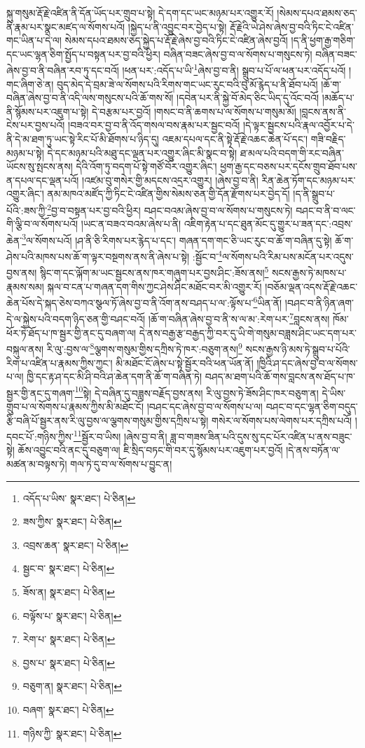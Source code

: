 སྐུ་གསུམ་རྡོ་རྗེ་འཛིན་ནི་དོན་ཡོད་པར་གྲུབ་པ་སྟེ། དེ་དག་དང་ཡང་མཉམ་པར་འགྱུར་རོ། །སེམས་དཔའ་ཐམས་ཅད་ནི་རྣམ་པར་སྣང་མཛད་ལ་སོགས་པའོ། །སྐྱེད་པ་ནི་འབྱུང་བར་བྱེད་པ་སྟེ། རྡོ་རྗེའི་ཡེ་ཤེས་ཞེས་བྱ་བའི་ཏིང་ངེ་འཛིན་གང་ཡིན་པ་དེ་ལ། སེམས་དཔའ་ཐམས་ཅད་སྐྱེད་པ་རྡོ་རྗེ་ཞེས་བྱ་བའི་ཏིང་ངེ་འཛིན་ཞེས་བྱའོ། །ད་ནི་ཕྱག་རྒྱ་གཅིག་དང་ཡང་ལྷན་ཅིག་སྤྱོད་པ་བསྟན་པར་བྱ་བའི་ཕྱིར། བཞིན་བཟང་ཞེས་བྱ་བ་ལ་སོགས་པ་གསུངས་ཏེ། བཞིན་བཟང་ཞེས་བྱ་བ་ནི་བཞིན་རབ་ཏུ་དང་བའོ། །ཕན་པར་:འདོད་པ་ཡི་\footnote{འདོད་པ་ཡིས་  སྣར་ཐང་།  པེ་ཅིན། }ཞེས་བྱ་བ་ནི། སྒྲུབ་པ་པོ་ལ་ཕན་པར་འདོད་པའོ། །གང་ཞིག་ཅེ་ན། བུད་མེད་དེ་བྲམ་ཟེ་ལ་སོགས་པའི་རིགས་གང་ཡང་རུང་བའི་བུ་མོ་རྙེད་པ་ནི་ཐོབ་པའོ། །ཆོ་ག་བཞིན་ཞེས་བྱ་བ་ནི་འདི་ལས་གསུངས་པའི་ཆོ་གས་སོ། །དབེན་པར་ནི་སྐྱེ་བོ་མེད་ཅིང་ཡིད་དུ་འོང་བའོ། །མཆོད་པ་ནི་སྙོམས་པར་འཇུག་པ་སྟེ། དེ་བརྩམ་པར་བྱའོ། །གསང་བ་ནི་ཆགས་པ་ལ་སོགས་པ་གསུམ་མོ། །བླངས་ནས་ནི་ངེས་པར་བྱས་པའོ། །བཟའ་བར་བྱ་བ་ནི་འོད་གསལ་བས་རྣམ་པར་སྦྱང་བའོ། །དེ་ལྟར་སྦྱངས་པའི་རྣལ་འབྱོར་པ་དེ་ནི་དེ་མ་ཐག་ཏུ་ཡང་སྟེ་རིང་པོ་མི་ཐོགས་པ་ཉིད་དུ། འཇམ་དཔལ་དང་ནི་སྟེ་རྡོ་རྗེ་འཆང་ཆེན་པོ་དང་། གཟི་བརྗིད་མཉམ་པ་སྟེ། དེ་དང་མཉམ་པའི་མཐུ་དང་ལྡན་པར་འགྱུར་ཞིང་མི་སྣང་བ་སྟེ། ཐ་མལ་པའི་བདག་གི་རང་བཞིན་ཡོངས་སུ་སྤངས་ནས། དེའི་འོག་ཏུ་བདག་པོ་སྟེ་གཙོ་བོར་འགྱུར་ཞིང་། ཕྱག་རྒྱ་དང་བཅས་པར་དངོས་གྲུབ་ཐོབ་པས་ན་དཔལ་དང་ལྡན་པའོ། །འཛམ་བུ་གསེར་གྱི་མདངས་འདྲར་འགྱུར། །ཞེས་བྱ་བ་ནི། རིན་ཆེན་ཏོག་དང་མཉམ་པར་འགྱུར་ཞིང་། ནམ་མཁའ་མཛོད་ཀྱི་ཏིང་ངེ་འཛིན་གྱིས་སེམས་ཅན་གྱི་དོན་རྫོགས་པར་བྱེད་དོ། །ད་ནི་སྒྲུབ་པ་པོའི་:ཟས་ཀྱི་\footnote{ཟས་ཀྱིས་  སྣར་ཐང་།  པེ་ཅིན། }བྱ་བ་བསྟན་པར་བྱ་བའི་ཕྱིར། བཤང་བའམ་ཞེས་བྱ་བ་ལ་སོགས་པ་གསུངས་ཏེ། བཤང་བ་ནི་བ་ལང་གི་ལྕི་བ་ལ་སོགས་པའོ། །ཡང་ན་བཟའ་བའམ་ཞེས་པ་ནི། འཇིག་རྟེན་པ་དང་ཐུན་མོང་དུ་གྱུར་པ་ཟན་དང་:འབྲས་ཆེན་\footnote{འབྲས་ཆན་  སྣར་ཐང་།  པེ་ཅིན། }ལ་སོགས་པའོ། །ཤ་ནི་ཅི་རིགས་པར་རྙེད་པ་དང་། གཞན་དག་གང་ཅི་ཡང་རུང་བ་ཆོ་ག་བཞིན་དུ་སྟེ། ཆོ་ག་ཤེས་པའི་མཁས་པས་ཆོ་ག་ལྟར་བསྔགས་ནས་ནི་ཞེས་པ་སྟེ། :སྦྱོང་བ་\footnote{སྦྱང་བ་  སྣར་ཐང་།  པེ་ཅིན། }ལ་སོགས་པའི་རིམ་པས་མངོན་པར་འདུས་བྱས་ནས། སྙིང་ག་དང་ལྐོག་མ་ཡང་སྦྱངས་ནས་ཁར་གཞུག་པར་བྱས་ཤིང་:ཟོས་ནས།\footnote{ཟོས་ན།  སྣར་ཐང་།  པེ་ཅིན། } སངས་རྒྱས་ཏེ་མཁས་པ་རྣམས་སམ། སྐལ་བ་ངན་པ་གཞན་དག་གིས་ཀྱང་ཤེས་ཤིང་མཐོང་བར་མི་འགྱུར་རོ། །བཅོམ་ལྡན་འདས་རྡོ་རྗེ་འཆང་ཆེན་པོས་དེ་སྐད་ཅེས་བཀའ་སྩལ་ཏོ་ཞེས་བྱ་བ་ནི་འོག་ནས་བཤད་པ་ལ་:ལྟོས་པ་\footnote{བལྟོས་པ་  སྣར་ཐང་།  པེ་ཅིན། }ཡིན་ནོ། །བཤང་བ་ནི་ཉིན་ཞག་དེ་ལ་སྐྱེས་པའི་བདག་ཉིད་ཅན་གྱི་བཤང་བའོ། །ཆོ་ག་བཞིན་ཞེས་བྱ་བ་ནི་ས་ལ་མ་:རེག་པར་\footnote{རེག་པ་  སྣར་ཐང་།  པེ་ཅིན། }བླངས་ནས། ཁོམ་ཕོར་ཏེ་ཐོད་པ་ཁ་སྦྱར་གྱི་ནང་དུ་བཞག་ལ། དེ་ནས་བརྒྱ་རྩ་བརྒྱད་ཀྱི་བར་དུ་ཡི་གེ་གསུམ་བཟླས་ཤིང་ཡང་དག་པར་བསྐུལ་ནས། རི་ལུ་:བྱས་ལ་\footnote{བྱས་པ་  སྣར་ཐང་།  པེ་ཅིན། }ལྕགས་གསུམ་གྱིས་དཀྲིས་ཏེ་ཁར་:བཅུག་ནས།\footnote{བཅུག་ན།  སྣར་ཐང་།  པེ་ཅིན། } སངས་རྒྱས་ཉི་མས་ཏེ་སྒྲུབ་པ་པོའི་རིག་པ་འཛིན་པ་རྣམས་ཀྱིས་ཀྱང་། མི་མཐོང་ངོ་ཞེས་པ་སྟེ་སྦྱོར་བའི་ཕན་ཡོན་ནོ། །ཁྱིའི་ཤ་དང་ཞེས་བྱ་བ་ལ་སོགས་པ་ལ། ཁྱི་དང་རྟ་ཤ་དང་མི་ཤི་བའི་ཤ་ཆེན་དག་ནི་ཆོ་ག་བཞིན་ཏེ། བཤད་མ་ཐག་པའི་ཆོ་གས་བླངས་ནས་ཐོད་པ་ཁ་སྦྱར་གྱི་ནང་དུ་གཞག་\footnote{བཞག་  སྣར་ཐང་།  པེ་ཅིན། }སྟེ། དེ་བཞིན་དུ་བཟླས་བརྗོད་བྱས་ནས། རི་ལུ་བྱས་ཏེ་ཟོས་ཤིང་ཁར་བཅུག་ན། དེ་ཡིས་གྲུབ་པ་ལ་སོགས་པ་རྣམས་ཀྱིས་མི་མཐོང་ངོ། །བཤང་དང་ཞེས་བྱ་བ་ལ་སོགས་པ་ལ། བཤང་བ་དང་ལྷན་ཅིག་བདུད་རྩི་བཞི་པོ་སྦྱར་ནས་རི་ལུ་བྱས་ལ་ལྕགས་གསུམ་གྱིས་དཀྲིས་པ་སྟེ། གསེར་ལ་སོགས་པས་ལེགས་པར་དཀྲིས་པའོ། །དབང་པོ་:གཉིས་ཀྱིས་\footnote{གཉིས་ཀྱི་  སྣར་ཐང་།  པེ་ཅིན། }སྦྱོར་བ་ཡིས། །ཞེས་བྱ་བ་ནི། ཟླ་བ་གཟས་ཟིན་པའི་དུས་སུ་དང་པོར་འཛིན་པ་ནས་བཟུང་སྟེ། ཆོས་འབྱུང་བའི་ནང་དུ་བཅུག་ལ། ཇི་སྲིད་བཏང་གི་བར་དུ་སྙོམས་པར་འཇུག་པར་བྱའོ། །དེ་ནས་བཏོན་ལ་མཚན་མ་བལྟས་ཏེ། གལ་ཏེ་དུ་བ་ལ་སོགས་པ་བྱུང་ན། 